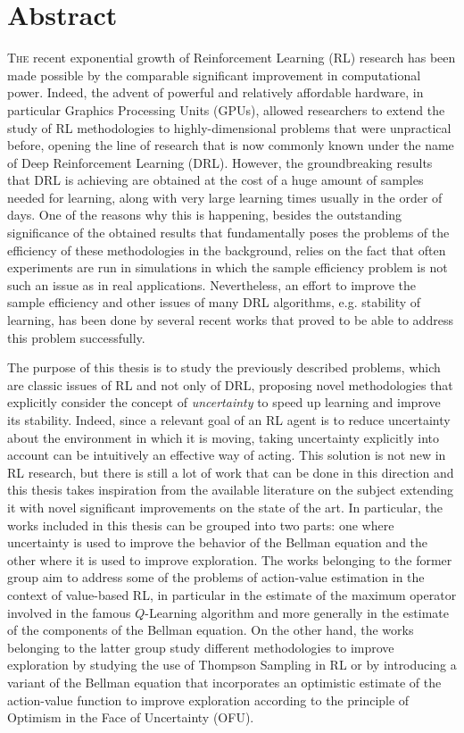 \chapter*{Abstract}
\lettrine{T}{he} recent exponential growth of Reinforcement Learning (RL) research has been made possible by the comparable significant improvement in computational power. Indeed, the advent of powerful and relatively affordable hardware, in particular Graphics Processing Units (GPUs), allowed researchers to extend the study of RL methodologies to highly-dimensional problems that were unpractical before, opening the line of research that is now commonly known under the name of Deep Reinforcement Learning (DRL). However, the groundbreaking results that DRL is achieving are obtained at the cost of a huge amount of samples needed for learning, along with very large learning times usually in the order of days. One of the reasons why this is happening, besides the outstanding significance of the obtained results that fundamentally poses the problems of the efficiency of these methodologies in the background, relies on the fact that often experiments are run in simulations in which the sample efficiency problem is not such an issue as in real applications. Nevertheless, an effort to improve the sample efficiency and other issues of many DRL algorithms, e.g. stability of learning, has been done by several recent works that proved to be able to address this problem successfully.

The purpose of this thesis is to study the previously described problems, which are classic issues of RL and not only of DRL, proposing novel methodologies that explicitly consider the concept of \textit{uncertainty} to speed up learning and improve its stability. Indeed, since a relevant goal of an RL agent is to reduce uncertainty about the environment in which it is moving, taking uncertainty explicitly into account can be intuitively an effective way of acting. This solution is not new in RL research, but there is still a lot of work that can be done in this direction and this thesis takes inspiration from the available literature on the subject extending it with novel significant improvements on the state of the art. In particular, the works included in this thesis can be grouped into two parts: one where uncertainty is used to improve the behavior of the Bellman equation and the other where it is used to improve exploration. The works belonging to the former group aim to address some of the problems of action-value estimation in the context of value-based RL, in particular in the estimate of the maximum operator involved in the famous $Q$-Learning algorithm and more generally in the estimate of the components of the Bellman equation. On the other hand, the works belonging to the latter group study different methodologies to improve exploration by studying the use of Thompson Sampling in RL or by introducing a variant of the Bellman equation that incorporates an optimistic estimate of the action-value function to improve exploration according to the principle of Optimism in the Face of Uncertainty (OFU).

